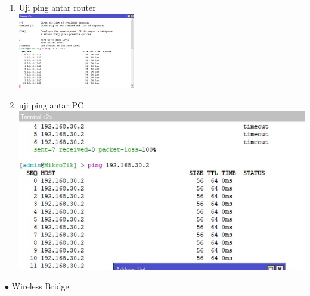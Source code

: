 \begin{enumerate}
	\item Uji ping antar router\\
	\includegraphics[width=0.4\textwidth]{p4/img/pingrslt3.jpg}
	\item uji ping antar PC\\
	\includegraphics{p4/img/pingrslt2.jpg}
\end{enumerate}
$\bullet$ Wireless Bridge
